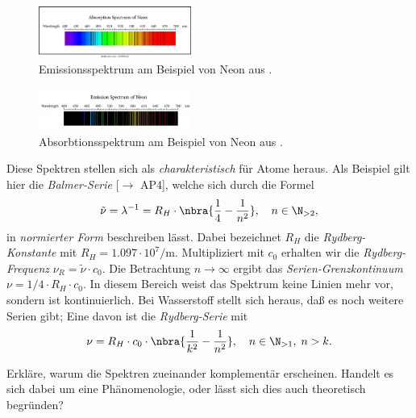 \documentclass{subfiles}
\begin{document}
            \begin{figure}
                \centering
                \includegraphics[width=5cm]{Bilddateien/AbsorbtionsspektrumNeon.png}
                \caption{Emissionsspektrum am Beispiel von Neon aus \cite{sutterstock:AbsorbtionNeon}.}
            \end{figure}

            \begin{figure}
                \centering
                \includegraphics[width=5cm]{Bilddateien/EmissionsspektrumNeon-transformed.png}
                \caption{Absorbtionsspektrum am Beispiel von Neon aus \cite{sutterstock:EmissionNeon}.}
            \end{figure}
            Diese Spektren stellen sich als \emph{charakteristisch} für Atome heraus. Als Beispiel gilt hier die \emph{Balmer-Serie} [$\to$ AP4], welche sich durch die Formel
            \[\tilde\nu = \lambda^{-1} = R_H\cdot\nbra{\frac{1}{4} - \frac{1}{n^2}},\quad n\in\N_{>2},\]
            in \emph{normierter Form} beschreiben lässt. Dabei bezeichnet $R_H$ die \emph{Rydberg-Konstante} mit $R_H = 1.097\cdot 10^7\si{\per\meter}$. Multipliziert mit $c_0$ erhalten wir die \emph{Rydberg-Frequenz} $\nu_R = \tilde\nu\cdot c_0$. Die Betrachtung $n\to\infty$ ergibt das \emph{Serien-Grenzkontinuum} $\nu = 1/4\cdot R_H\cdot c_0$. In diesem Bereich weist das Spektrum keine Linien mehr vor, sondern ist kontinuierlich. Bei Wasserstoff stellt sich heraus, daß es noch weitere Serien gibt; Eine davon ist die \emph{Rydberg-Serie} mit
            \[\nu = R_H\cdot c_0\cdot \nbra{\frac{1}{k^2} - \frac{1}{n^2}},\quad n\in\N_{>1},\; n>k.\] 
            
            
            \begin{Aufgabe}
                \nr{} Erkläre, warum die Spektren zueinander komplementär erscheinen. Handelt es sich dabei um eine Phänomenologie, oder lässt sich dies auch theoretisch begründen?
            \end{Aufgabe}
\end{document}
